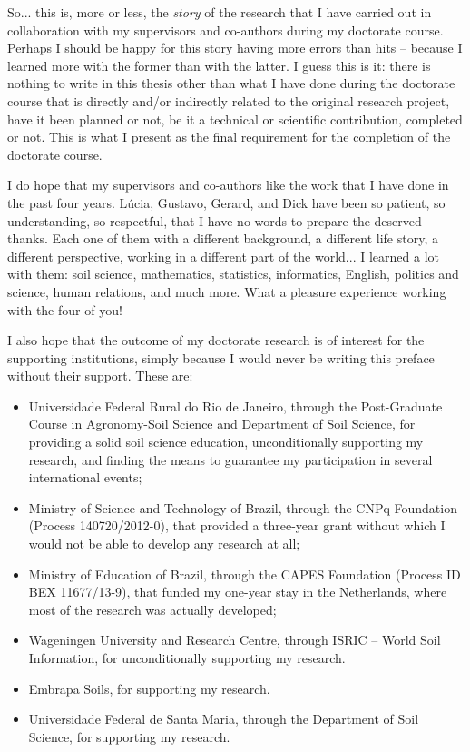 So... this is, more or less, the \emph{story} of the research that I have carried out in collaboration with my 
supervisors and co-authors during my doctorate course. Perhaps I should be happy for this story having more 
errors than hits -- because I learned more with the former than with the latter. I guess this is it: there is 
nothing to write in this thesis other than what I have done during the doctorate course that is directly 
and/or 
indirectly related to the original research project, have it been planned or not, be it a technical or 
scientific contribution, completed or not. This is what I present as the final requirement for the completion 
of the doctorate course.

I do hope that my supervisors and co-authors like the work that I have done in the past four years. Lúcia, 
Gustavo, Gerard, and Dick have been so patient, so understanding, so respectful, that I have no words to 
prepare the deserved thanks. Each one of them with a different background, a different life story, a different 
perspective, working in a different part of the world... I learned a lot with them: soil science, mathematics, 
statistics, informatics, English, politics and science, human relations, and much more. What a pleasure 
experience working with the four of you!

I also hope that the outcome of my doctorate research is of interest for the supporting institutions, simply 
because I would never be writing this preface without their support. These are:

\begin{itemize}
 \item Universidade Federal Rural do Rio de Janeiro, through the Post-Graduate Course in Agronomy-Soil Science
 and Department of Soil Science, for providing a solid soil science education, unconditionally supporting my 
 research, and finding the means to guarantee my participation in several international events;
 
 \item Ministry of Science and Technology of Brazil, through the CNPq Foundation (Process 140720/2012-0), that
 provided a three-year grant without which I would not be able to develop any research at all;
 
 \item Ministry of Education of Brazil, through the CAPES Foundation (Process ID BEX 11677/13-9), that funded
 my one-year stay in the Netherlands, where most of the research was actually developed;
 
 \item Wageningen University and Research Centre, through ISRIC -- World Soil Information, for unconditionally
 supporting my research.
 
 \item Embrapa Soils, for supporting my research.
 
 \item Universidade Federal de Santa Maria, through the Department of Soil Science, for supporting my research.
\end{itemize}

